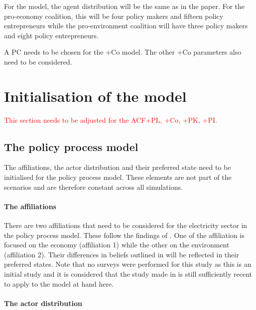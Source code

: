 \documentclass[12pt]{article}
\begin{document}
For the model, the agent distribution will be the same as in the paper. For the pro-economy coalition, this will be four policy makers and fifteen policy entrepreneurs while the pro-environment coalition will have three policy makers and eight policy entrepreneurs.



A PC needs to be chosen for the +Co model. The other +Co parameters also need to be considered.



\section{Initialisation of the model}
\label{sec:elec_initialisation}

\textcolor{red}{This section needs to be adjusted for the ACF+PL, +Co, +PK, +PI.}


\subsection{The policy process model}

The affiliations, the actor distribution and their preferred state need to be initialised for the policy process model. These elements are not part of the scenarios and are therefore constant across all simulations.

\paragraph{The affiliations}

There are two affiliations that need to be considered for the electricity sector in the policy process model. These follow the findings of \cite{markard2016socio}. One of the affiliation is focused on the economy (affiliation 1) while the other on the environment (affiliation 2). Their differences in beliefs outlined in \cite{markard2016socio} will be reflected in their preferred states. Note that no surveys were performed for this study as this is an initial study and it is considered that the study made in \cite{markard2016socio} is still sufficiently recent to apply to the model at hand here.


\paragraph{The actor distribution}
\end{document}
